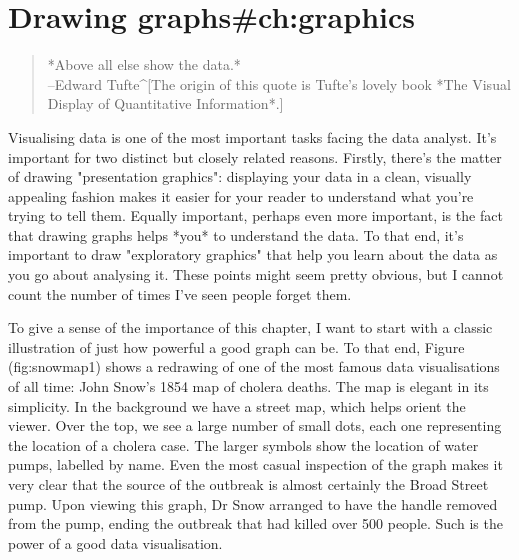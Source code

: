 

\chapter{Drawing graphs{#ch:graphics}}

\begin{quote}
*Above all else show the data.*\\
\hspace*{2cm} --Edward Tufte^[The origin of this quote is Tufte's lovely book *The Visual Display of Quantitative Information*.]
\end{quote}


Visualising data is one of the most important tasks facing the data analyst. It's important for two distinct but closely related reasons. Firstly, there's the matter of drawing "presentation graphics": displaying your data in a clean, visually appealing fashion makes it easier for your reader to understand what you're trying to tell them. Equally important, perhaps even more important, is the fact that drawing graphs helps *you* to understand the data. To that end, it's important to draw "exploratory graphics" that help you learn about the data as you go about analysing it. These points might seem pretty obvious, but I cannot count the number of times I've seen people forget them. 

To give a sense of the importance of this chapter, I want to start with a classic illustration of just how powerful a good graph can be. To that end, Figure \@ref(fig:snowmap1) shows a redrawing of one of the most famous data visualisations of all time: John Snow's 1854 map of cholera deaths. The map is elegant in its simplicity. In the background we have a street map, which helps orient the viewer. Over the top, we see a large number of small dots, each one representing the location of a cholera case. The larger symbols show the location of water pumps, labelled by name. Even the most casual inspection of the graph makes it very clear that the source of the outbreak is almost certainly the Broad Street pump. Upon viewing this graph, Dr Snow arranged to have the handle removed from the pump, ending the outbreak that had killed over 500 people. Such is the power of a good data visualisation.


